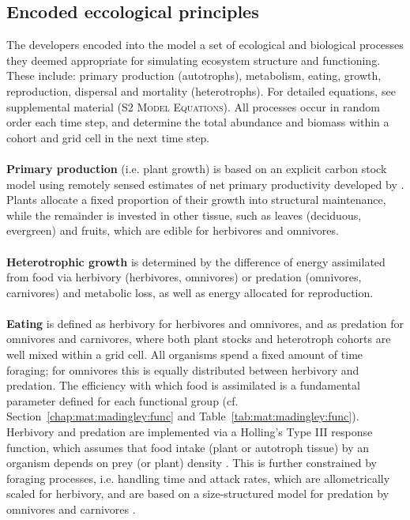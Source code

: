 \subsection{Encoded eccological principles}
\label{chap:mat:madingley:princip}
The developers encoded into the model a set of ecological and biological processes they deemed appropriate for simulating ecosystem structure and functioning. These include: primary production (autotrophs), metabolism, eating, growth, reproduction, dispersal and mortality (heterotrophs). For detailed equations, see supplemental material (S2 \textsc{Model Equations}). All processes occur in random order each time step, and determine the total abundance and biomass within a cohort and grid cell in the next time step. \\\\
\textbf{Primary production} (i.e. plant growth) is based on an explicit carbon stock model using remotely sensed estimates of net primary productivity developed by \cite{Smith2012}. 
Plants allocate a fixed proportion of their growth into structural maintenance, while the remainder is invested in other tissue, such as leaves (deciduous, evergreen) and fruits, which are edible for herbivores and omnivores. 
\\\\
\textbf{Heterotrophic growth} is determined by the difference of energy assimilated from food via herbivory (herbivores, omnivores) or predation (omnivores, carnivores) and metabolic loss, as well as energy allocated for reproduction.\\\\
\textbf{Eating} is defined as herbivory for herbivores and omnivores, and as predation for omnivores and carnivores, where both plant stocks and heterotroph cohorts are well mixed within a grid cell. All organisms spend a fixed amount of time foraging; for omnivores this is equally distributed between herbivory and predation. 
The efficiency with which food is assimilated is a fundamental parameter defined for each functional group (cf. Section~\ref{chap:mat:madingley:func} and Table~\ref{tab:mat:madingley:func}). \\
Herbivory and predation are implemented via a Holling's Type III response function, which assumes that food intake (plant or autotroph tissue) by an organism depends on prey (or plant) density \citep{Denno2012}. 
This is further constrained by foraging processes, i.e. handling time and attack rates, which are allometrically scaled for herbivory, and are based on a size-structured model for predation by omnivores and carnivores \citep[after][cf. S2 \textsc{Model Equations}]{Williams2011}. 
